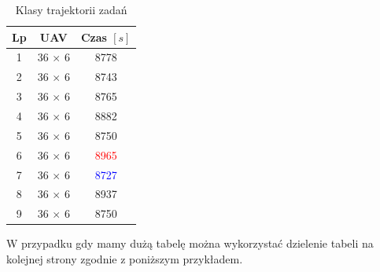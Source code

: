 

\begin{table}[H]
    \caption{Klasy trajektorii zadań}
    \label{tab2}
    \centering
    \begin{tabular}{ccc}
        \toprule
        \textbf{Lp} & \textbf{UAV}  & \textbf{Czas $\left [ s \right ]$} \\ \toprule
        1           & 36 $\times$ 6 & 8778                               \\
        2           & 36 $\times$ 6 & 8743                               \\
        3           & 36 $\times$ 6 & 8765                               \\
        4           & 36 $\times$ 6 & 8882                               \\
        5           & 36 $\times$ 6 & 8750                               \\
        6           & 36 $\times$ 6 & \textcolor{red}{8965}              \\
        7           & 36 $\times$ 6 & \textcolor{blue}{8727}             \\
        8           & 36 $\times$ 6 & 8937                               \\
        9           & 36 $\times$ 6 & 8750                               \\ \bottomrule
    \end{tabular}
\end{table}

W przypadku gdy mamy dużą tabelę można wykorzystać dzielenie tabeli na kolejnej strony zgodnie z poniższym przykładem. 


